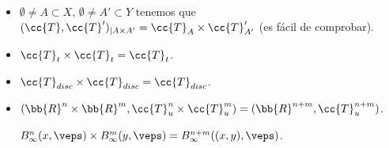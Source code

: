 \begin{ejemplo}\
    \begin{itemize}
        \item $\emptyset\neq A\subset X$, $\emptyset\neq A'\subset Y$ tenemos que $(\cc{T}, \cc{T}')_{|A\times A'}=\cc{T}_A \times \cc{T}_{A'}'$ (es fácil de comprobar).
        \item $\cc{T}_t\times \cc{T}_t = \cc{T}_t$.
        \item $\cc{T}_{disc}\times \cc{T}_{disc}=\cc{T}_{disc}$.
        \item $(\bb{R}^n\times \bb{R}^m, \cc{T}_u^n\times \cc{T}_u^m) = (\bb{R}^{n+m}, \cc{T}_u^{n+m})$.
        
        $B_{\infty}^n(x, \veps)\times B_{\infty}^m(y, \veps) = B_{\infty}^{n+m}((x,y), \veps)$.
    \end{itemize}
\end{ejemplo}
